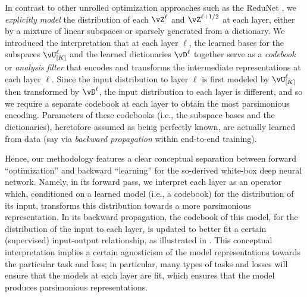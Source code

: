 \documentclass[../../book-main.tex]{subfiles}
\begin{document}
\begin{remark}\label{sub:forward_backward}
    In contrast to other unrolled optimization approaches such as the ReduNet \cite{chan2021redunet}, we \textit{explicitly model} the distribution of each $\vZ^\ell$ and $\vZ^{\ell + 1/2}$ at each layer, either by a mixture of linear subspaces or sparsely generated from a dictionary. We introduced the interpretation that at each layer \(\ell\), the learned bases for the subspaces \(\vU_{[K]}^{\ell}\) and the learned dictionaries \(\vD^{\ell}\) together serve as a \textit{codebook} or \textit{analysis filter} that encodes and transforms the intermediate representations at each layer \(\ell\). Since the input distribution to layer \(\ell\) is first modeled by \(\vU_{[K]}^{\ell}\) then transformed by \(\vD^{\ell}\), the input distribution to each layer is different, and so we require a separate codebook at each layer to obtain the most parsimonious encoding. Parameters of these codebooks (i.e., the subspace bases and the dictionaries), heretofore assumed as being perfectly known, are actually learned from data (say via \textit{backward propagation} within end-to-end training).
    
    Hence, our methodology features a clear conceptual separation between forward ``optimization'' and backward ``learning'' for the so-derived white-box deep neural network. Namely, in its forward pass, we interpret each layer as an operator which, conditioned on a learned model (i.e., a codebook) for the distribution of its input, transforms this distribution towards a more parsimonious representation. In its backward propagation, the codebook of this model, for the distribution of the input to each layer, is updated to better fit a certain (supervised) input-output relationship, as illustrated in . This conceptual interpretation implies a certain agnosticism of the model representations towards the particular task and loss; in particular, many types of tasks and losses will ensure that the models at each layer are fit, which ensures that the model produces parsimonious representations.
\end{remark}
\end{document}
